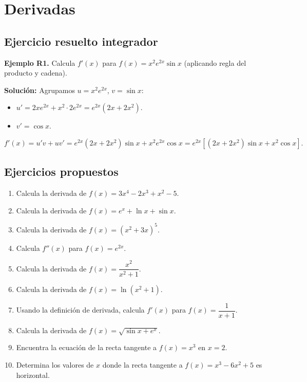 \documentclass[12pt, letterpaper]{article}
\begin{document}
\newpage

\section{Derivadas}

\subsection{Ejercicio resuelto integrador}

\textbf{Ejemplo R1.} Calcula $f'(x)$ para $f(x) = x^2 e^{2x} \sin x$ (aplicando regla del producto y cadena).

\begin{cuadrosolucion}
  \textbf{Solución:} Agrupamos $u = x^2 e^{2x}$, $v = \sin x$:
  \begin{itemize}
    \item $u' = 2x e^{2x} + x^2 \cdot 2e^{2x} = e^{2x}(2x + 2x^2)$.
    \item $v' = \cos x$.
  \end{itemize}
  $$f'(x) = u'v + uv' = e^{2x}(2x + 2x^2)\sin x + x^2 e^{2x} \cos x = e^{2x}\left[(2x + 2x^2)\sin x + x^2 \cos x\right].$$
\end{cuadrosolucion}

\subsection{Ejercicios propuestos}

\begin{enumerate}[resume=ejercicios, leftmargin=*]
  \item \facil{} Calcula la derivada de $f(x) = 3x^4 - 2x^3 + x^2 - 5$.

  \item \facil{} Calcula la derivada de $f(x) = e^x + \ln x + \sin x$.

  \item \facil{} Calcula la derivada de $f(x) = (x^2 + 3x)^5$.

  \item \facil{} Calcula $f''(x)$ para $f(x) = e^{2x}$.

  \item \medio{} Calcula la derivada de $f(x) = \dfrac{x^2}{x^2 + 1}$.

  \item \medio{} Calcula la derivada de $f(x) = \ln(x^2 + 1)$.

  \item \medio{} Usando la definición de derivada, calcula $f'(x)$ para $f(x) = \dfrac{1}{x + 1}$.

  \item \dificil{} Calcula la derivada de $f(x) = \sqrt{\sin x + e^x}$.

  \item \dificil{} Encuentra la ecuación de la recta tangente a $f(x) = x^3$ en $x = 2$.

  \item \dificil{} Determina los valores de $x$ donde la recta tangente a $f(x) = x^3 - 6x^2 + 5$ es horizontal.
\end{enumerate}
\end{document}

